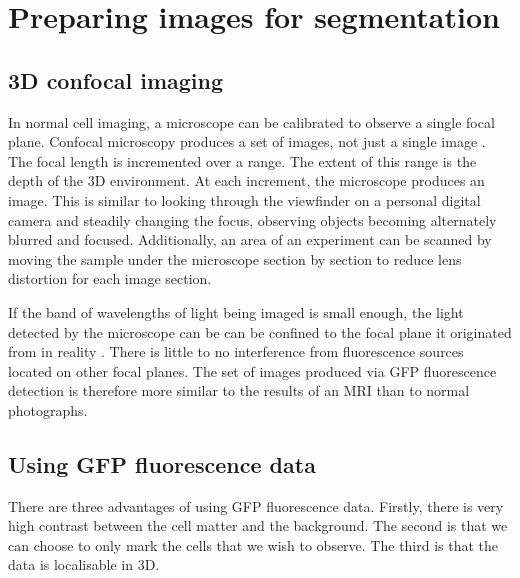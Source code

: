 
\chapter{Preparing images for segmentation}

\ifpdf
    \graphicspath{{Chapter3/Figs/Raster/}{Chapter3/Figs/PDF/}{Chapter3/Figs/}}
\else
    \graphicspath{{Chapter3/Figs/Vector/}{Chapter3/Figs/}}
\fi

\section{3D confocal imaging}

In normal cell imaging, a microscope can be calibrated to observe a single focal plane. Confocal microscopy produces a set of images, not just a single image . The focal length is incremented over a range. The extent of this range is the depth of the 3D environment. At each increment, the microscope produces an image. This is similar to looking through the viewfinder on a personal digital camera and steadily changing the focus, observing objects becoming alternately blurred and focused. Additionally, an area of an experiment can be scanned by moving the sample under the microscope section by section to reduce lens distortion for each image section.

If the band of wavelengths of light being imaged is small enough, the light detected by the microscope can be can be confined to the focal plane it originated from in reality . There is little to no interference from fluorescence sources located on other focal planes. The set of images produced via GFP fluorescence detection is therefore more similar to the results of an MRI than to normal photographs.

\section{Using GFP fluorescence data}

There are three advantages of using GFP fluorescence data. Firstly, there is very high contrast between the cell matter and the background. The second is that we can choose to only mark the cells that we wish to observe. The third is that the data is localisable in 3D.

